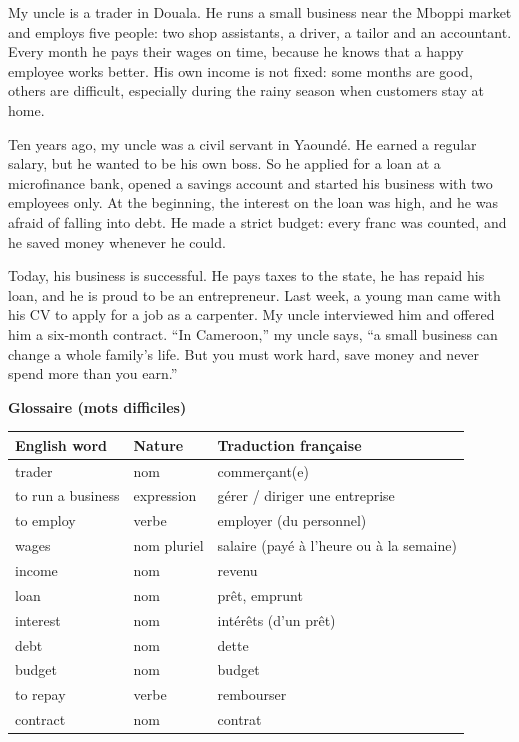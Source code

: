 \documentclass[11pt]{article}
\begin{document}
\begin{textebox}
My uncle is a trader in Douala. He runs a small business near the Mboppi market and employs five people: two shop assistants, a driver, a tailor and an accountant. Every month he pays their wages on time, because he knows that a happy employee works better. His own income is not fixed: some months are good, others are difficult, especially during the rainy season when customers stay at home.

Ten years ago, my uncle was a civil servant in Yaoundé. He earned a regular salary, but he wanted to be his own boss. So he applied for a loan at a microfinance bank, opened a savings account and started his business with two employees only. At the beginning, the interest on the loan was high, and he was afraid of falling into debt. He made a strict budget: every franc was counted, and he saved money whenever he could.

Today, his business is successful. He pays taxes to the state, he has repaid his loan, and he is proud to be an entrepreneur. Last week, a young man came with his CV to apply for a job as a carpenter. My uncle interviewed him and offered him a six-month contract. “In Cameroon,” my uncle says, “a small business can change a whole family's life. But you must work hard, save money and never spend more than you earn.”
\end{textebox}

\textbf{Glossaire (mots difficiles)}\par
\begin{center}
\begin{tabularx}{\linewidth}{|l|l|X|}
\hline
\rowcolor{popblueL} English word & Nature & Traduction française \\
\hline
trader & nom & commerçant(e) \\
\hline
to run a business & expression & gérer / diriger une entreprise \\
\hline
to employ & verbe & employer (du personnel) \\
\hline
wages & nom pluriel & salaire (payé à l'heure ou à la semaine) \\
\hline
income & nom & revenu \\
\hline
loan & nom & prêt, emprunt \\
\hline
interest & nom & intérêts (d'un prêt) \\
\hline
debt & nom & dette \\
\hline
budget & nom & budget \\
\hline
to repay & verbe & rembourser \\
\hline
contract & nom & contrat \\
\hline
\end{tabularx}
\end{center}
\end{document}

